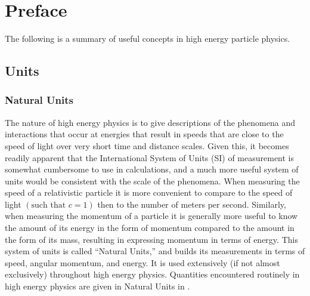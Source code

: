 \chapter*{Preface}\label{chapter:preface}

The following is a summary of useful concepts in high energy particle physics.

\section{Units}\label{section:units}

\subsection{Natural Units}\label{subsection:natural_units}

The nature of high energy physics is to give descriptions of the phenomena and interactions that occur at energies that result in speeds that are close to the speed of light over very short time and distance scales.
Given this, it becomes readily apparent that the International System of Units (SI) of measurement is somewhat cumbersome to use in calculations, and a much more useful system of units would be consistent with the scale of the phenomena.
When measuring the speed of a relativistic particle it is more convenient to compare to the speed of light $\left(\text{such that }c=1\right)$ then to the number of meters per second.
Similarly, when measuring the momentum of a particle it is generally more useful to know the amount of its energy in the form of momentum compared to the amount in the form of its mass, resulting in expressing momentum in terms of energy.
This system of units is called ``Natural Units,'' and builds its measurements in terms of speed, angular momentum, and energy.
It is used extensively (if not almost exclusively) throughout high energy physics.
Quantities encountered routinely in high energy physics are given in Natural Units in .
\clearpage

